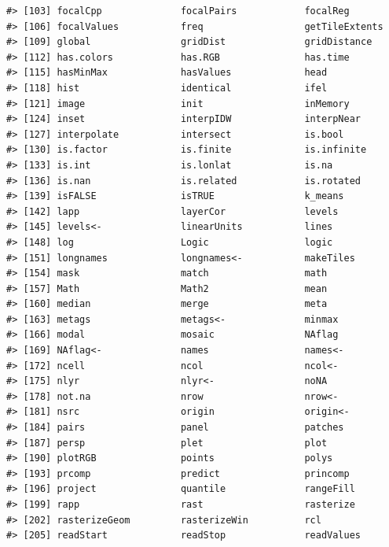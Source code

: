\documentclass[
]{book}
\begin{document}
\begin{verbatim}
#> [103] focalCpp              focalPairs            focalReg             
#> [106] focalValues           freq                  getTileExtents       
#> [109] global                gridDist              gridDistance         
#> [112] has.colors            has.RGB               has.time             
#> [115] hasMinMax             hasValues             head                 
#> [118] hist                  identical             ifel                 
#> [121] image                 init                  inMemory             
#> [124] inset                 interpIDW             interpNear           
#> [127] interpolate           intersect             is.bool              
#> [130] is.factor             is.finite             is.infinite          
#> [133] is.int                is.lonlat             is.na                
#> [136] is.nan                is.related            is.rotated           
#> [139] isFALSE               isTRUE                k_means              
#> [142] lapp                  layerCor              levels               
#> [145] levels<-              linearUnits           lines                
#> [148] log                   Logic                 logic                
#> [151] longnames             longnames<-           makeTiles            
#> [154] mask                  match                 math                 
#> [157] Math                  Math2                 mean                 
#> [160] median                merge                 meta                 
#> [163] metags                metags<-              minmax               
#> [166] modal                 mosaic                NAflag               
#> [169] NAflag<-              names                 names<-              
#> [172] ncell                 ncol                  ncol<-               
#> [175] nlyr                  nlyr<-                noNA                 
#> [178] not.na                nrow                  nrow<-               
#> [181] nsrc                  origin                origin<-             
#> [184] pairs                 panel                 patches              
#> [187] persp                 plet                  plot                 
#> [190] plotRGB               points                polys                
#> [193] prcomp                predict               princomp             
#> [196] project               quantile              rangeFill            
#> [199] rapp                  rast                  rasterize            
#> [202] rasterizeGeom         rasterizeWin          rcl                  
#> [205] readStart             readStop              readValues           

\end{verbatim}
\end{document}
